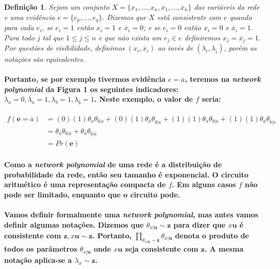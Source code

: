\documentclass[a4paper,10pt]{article}
\theoremstyle{plain}
\newtheorem*{spn-def}{Definição}
\begin{document}
\begin{spn-def} Sejam um conjunto $X=\{x_1,...,x_n,\overline{x}_1,...,\overline{x}_n\}$ das
variáveis da rede e uma evidência $e=\{e_p,...,e_q\}$. Dizemos que $X$ está consistente com $e$
quando para cada $e_i$, se $e_i=1$ então $x_i=1$ e $\overline{x}_i=0$; e se $e_i=0$ então $x_i=0$
e $\overline{x}_i=1$. Para todo $j$ tal que $1\leq{j}\leq{n}$ e que não exista um $e_j \in e$
definiremos $x_j=\overline{x}_j=1$. Por questões de visibilidade, definimos $(x_i, \overline{x}_i)$
ao invés de $(\lambda_{i}, \lambda_{\overline{i}})$, porém as notações são equivalentes.
\end{spn-def}

\paragraph{
  Portanto, se por exemplo tivermos evidência $e=\overline{a}$, teremos na \textit{network
polynomial} da Figura 1 os seguintes indicadores: $\lambda_{a}=0, \lambda_{\overline{a}}=1,
\lambda_{b}=1, \lambda_{\overline{b}}=1$. Neste exemplo, o valor de $f$ seria:
}

\begin{equation}
\begin{split}
f(\textbf{e}=\overline{a}) & = (0)(1)\theta_{a}\theta_{b|a} + (0)(1)\theta_{a}\theta_{\overline{b}|a} +
  (1)(1)\theta_{\overline{a}}\theta_{b|\overline{a}} +
  (1)(1)\theta_{\overline{a}}\theta_{\overline{b}|\overline{a}} \\
& = \theta_{\overline{a}}\theta_{b|\overline{a}} + \theta_{\overline{a}}\theta_{\overline{b}|\overline{a}} \\
& = Pr(\textbf{e})
\end{split}
\end{equation}

\paragraph{
  Como a \textit{network polynomial} de uma rede é a distribuição de probabilidade da rede, então
seu tamanho é exponencial. O circuito aritmético é uma representação compacta de $f$. Em alguns
casos $f$ não pode ser limitado, enquanto que o circuito pode.
}

\paragraph{
  Vamos definir formalmente uma \textit{network polynomial}, mas antes vamos definir algumas
notações. Dizemos que $\theta_{x|\textbf{u}} \sim \textbf{z}$ para dizer que $x\textbf{u}$ é
consistente com $\textbf{z}, x\textbf{u} \sim \textbf{z}$. Portanto,
$\prod_{\theta_{x|\textbf{u}} \sim \textbf{z}} \theta_{x|\textbf{u}}$ denota o produto de todos
os parâmetros $\theta_{x|\textbf{u}}$ onde $x\textbf{u}$ seja consistente com $\textbf{z}$. A mesma
notação aplica-se a $\lambda_x \sim \textbf{z}$.
}
\end{document}
